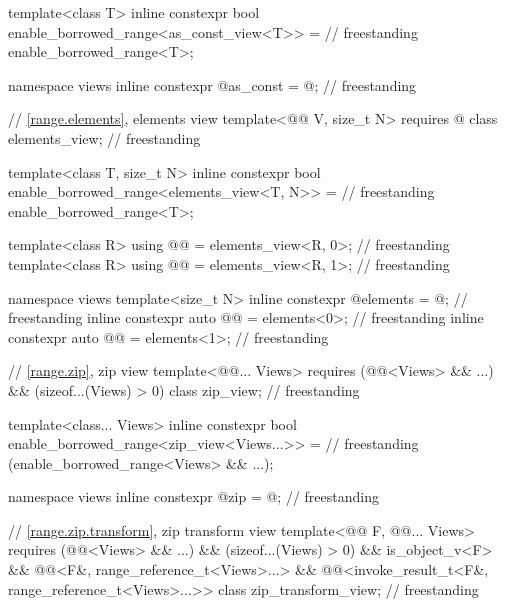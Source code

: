 \begin{codeblock}
{  template<class T>
    inline constexpr bool enable_borrowed_range<as_const_view<T>> =                 // freestanding
      enable_borrowed_range<T>;

  namespace views { inline constexpr @\unspecnc@ as_const = @\unspecnc@; }          // freestanding

  // \ref{range.elements}, elements view
  template<@@ V, size_t N>
    requires @\seebelow@
  class elements_view;                                                              // freestanding

  template<class T, size_t N>
    inline constexpr bool enable_borrowed_range<elements_view<T, N>> =              // freestanding
      enable_borrowed_range<T>;

  template<class R>
    using @@ = elements_view<R, 0>;                                          // freestanding
  template<class R>
    using @@ = elements_view<R, 1>;                                        // freestanding

  namespace views {
    template<size_t N>
      inline constexpr @\unspecnc@ elements = @\unspecnc@;                          // freestanding
    inline constexpr auto @@ = elements<0>;                                       // freestanding
    inline constexpr auto @@ = elements<1>;                                     // freestanding
  }

  // \ref{range.zip}, zip view
  template<@@... Views>
    requires (@@<Views> && ...) && (sizeof...(Views) > 0)
  class zip_view;                                                                   // freestanding

  template<class... Views>
    inline constexpr bool enable_borrowed_range<zip_view<Views...>> =               // freestanding
      (enable_borrowed_range<Views> && ...);

  namespace views { inline constexpr @\unspecnc@ zip = @\unspecnc@; }               // freestanding

  // \ref{range.zip.transform}, zip transform view
  template<@@ F, @@... Views>
    requires (@@<Views> && ...) && (sizeof...(Views) > 0) && is_object_v<F> &&
             @@<F&, range_reference_t<Views>...> &&
             @@<invoke_result_t<F&, range_reference_t<Views>...>>
  class zip_transform_view;                                                         // freestanding

}
\end{codeblock}
